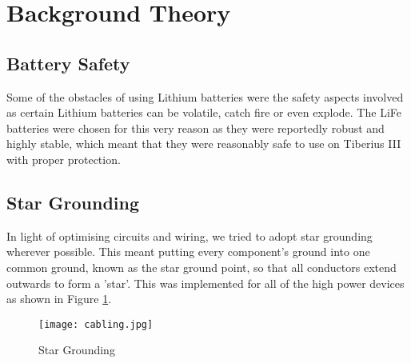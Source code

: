 \section{Background Theory}

\subsection{Battery Safety}

Some of the obstacles of using Lithium batteries were the safety aspects involved as certain Lithium batteries can be volatile, catch fire or even explode.
\newline
The LiFe batteries were chosen for this very reason as they were reportedly robust and highly stable, which meant that they were reasonably safe to use on Tiberius III with proper protection.

\subsection{Star Grounding}
In light of optimising circuits and wiring, we tried to adopt star grounding wherever possible.  This meant putting every component's ground into one common ground, known as the star ground point, so that all conductors extend outwards to form a 'star'. This was implemented for all of the high power devices as shown in Figure \ref{fig:Cabling}.

\begin{figure}[!htb]
\begin{center}
\texttt{[image: cabling.jpg]}
\end{center}
\caption{Star Grounding}
\label{fig:Cabling}
\end{figure}